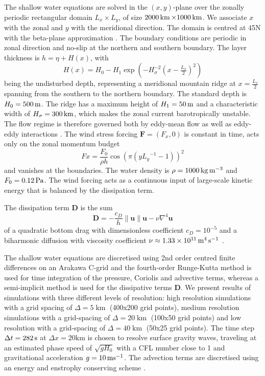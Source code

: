 The shallow water equations are solved in the $(x,y)$-plane over the zonally periodic rectangular domain $L_x \times L_y$,
of size $2000\operatorname{km} \times 1000\operatorname{km}$. We associate $x$ with the zonal and $y$ with the meridional direction. The domain
is centred at 45N with the beta-plane approximation \citep{Vallis2006}. The boundary conditions are periodic in zonal direction
and no-slip at the northern and southern boundary. The layer thickness is $h = \eta + H(x)$, with
\begin{equation}
H(x) = H_0 - H_1\exp\left(-H_\sigma^{-2}(x-\tfrac{L_x}{2})^2\right)
\end{equation}
being the undisturbed depth, representing a meridional mountain ridge at $x=\tfrac{L_x}{2}$ spanning from the southern to
the northern boundary. The standard depth is $H_0 = 500\operatorname{m}$. The ridge has a maximum height of $H_1 = 50\operatorname{m}$
and a characteristic width of $H_\sigma = 300\operatorname{km}$, which makes the zonal current barotropically unstable. The flow
regime is therefore governed both by eddy-mean flow as well as eddy-eddy interactions \citep{Ferrari2010}. The wind stress
forcing $\mathbf{F} = (F_x,0)$ is constant in time, acts only on the zonal momentum budget
\begin{equation}
Fx = \frac{F_0}{\rho h} \cos\left(\pi\left(y{L_y}^{-1} - 1\right)\right)^2
\end{equation}
and vanishes at the boundaries. The water density is $\rho = 1000\operatorname{kg}\operatorname{m}^{-3}$ and $F_0 = 0.12\operatorname{Pa}$.
The wind forcing acts as a continuous input of large-scale kinetic energy that is balanced by the dissipation term.

The dissipation term $\mathbf{D}$ is the sum
\begin{equation}
\mathbf{D} = -\frac{c_D}{h}\| \mathbf{u} \| \mathbf{u} - \nu \nabla^4 \mathbf{u}
\label{eq:diss}
\end{equation}
of a quadratic bottom drag with dimensionless coefficient $c_D = 10^{-5}$ \citep{Arbic2008}
and a biharmonic diffusion with viscosity coefficient $\nu \approx 1.33\times10^{11} \operatorname{m}^4\operatorname{s}^{-1}$ \citep{Griffies2000}.

The shallow water equations are discretised using 2nd order centred finite differences on an Arakawa C-grid \citep{Arakawa1977}
and the fourth-order Runge-Kutta method \citep{Butcher2016} is used for time integration of the pressure, Coriolis and advective terms,
whereas a semi-implicit method is used for the dissipative terms $\mathbf{D}$. We present results of simulations with three different
levels of resolution: high resolution simulations with a grid spacing of $\Delta = 5\operatorname{km}$ (400x200 grid points), medium
resolution simulations with a grid-spacing of $\Delta = 20\operatorname{km}$ (100x50 grid points) and low resolution with a
grid-spacing of $\Delta = 40\operatorname{km}$ (50x25 grid points). The time step $\Delta t = 282\operatorname{s}$ at
$\Delta x = 20\mathrm{km}$ is chosen to resolve surface gravity waves, traveling at an estimated phase speed of
$\sqrt{gH_0}$ with a CFL number close to 1 and gravitational acceleration $g=10\operatorname{ms}^{-1}$. The advection terms are discretised
using an energy and enstrophy conserving scheme \citep{Arakawa1990,Salmon2004,Salmon2007}.

